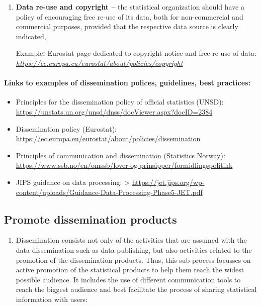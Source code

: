 \documentclass[
]{article}
\providecommand{\tightlist}{%
  \setlength{\itemsep}{0pt}\setlength{\parskip}{0pt}}
\begin{document}
\begin{enumerate}
\def\labelenumi{\arabic{enumi}.}
\setcounter{enumi}{25}
\item
  \textbf{Data re-use and copyright --} the statistical organization should
  have a policy of encouraging free re-use of its data, both for
  non-commercial and commercial purposes, provided that the respective
  data source is clearly indicated,

  Example\textbf{:} Eurostat page dedicated to copyright notice and free
  re-use of data:
  \href{https://ec.europa.eu/eurostat/about/policies/copyright}{\emph{https://ec.europa.eu/eurostat/about/policies/copyright}}
\end{enumerate}

\hypertarget{links-to-examples-of-dissemination-polices-guidelines-best-practices-1}{%
\paragraph{Links to examples of dissemination polices, guidelines, best practices:}\label{links-to-examples-of-dissemination-polices-guidelines-best-practices-1}}

\begin{itemize}
\item
  Principles for the dissemination policy of official statistics
  (UNSD): \url{https://unstats.un.org/unsd/dnss/docViewer.aspx?docID=2384}
\item
  Dissemination policy (Eurostat):
  \url{https://ec.europa.eu/eurostat/about/policies/dissemination}
\item
  Principles of communication and dissemination (Statistics Norway):
  \url{https://www.ssb.no/en/omssb/lover-og-prinsipper/formidlingspolitikk}
\end{itemize}

\begin{itemize}
\tightlist
\item
  JIPS guidance on data processing: {}
  \textgreater{} \url{https://jet.jips.org/wp-content/uploads/Guidance-Data-Processing-Phase5-JET.pdf}
\end{itemize}

\hypertarget{promote-dissemination-products-1}{%
\subsection{Promote dissemination products}\label{promote-dissemination-products-1}}

\begin{enumerate}
\def\labelenumi{\arabic{enumi}.}
\setcounter{enumi}{524}
\tightlist
\item
  Dissemination consists not only of the activities that are assumed
  with the data dissemination such as data publishing, but also
  activities related to the promotion of the dissemination products.
  Thus, this sub-process focusses on active promotion of the
  statistical products to help them reach the widest possible
  audience. It includes the use of different communication tools to
  reach the biggest audience and best facilitate the process of
  sharing statistical information with users:
\end{enumerate}
\end{document}
